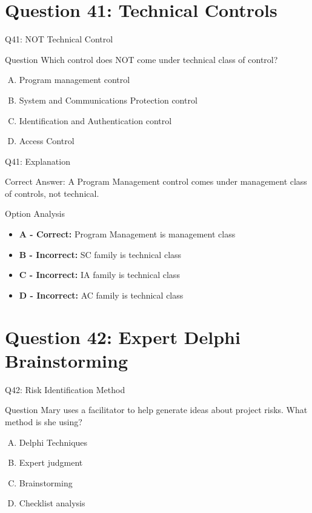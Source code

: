 \documentclass{beamer}
\begin{document}
	\section{Question 41: Technical Controls}
	
	\begin{frame}{Q41: NOT Technical Control}
		\begin{block}{Question}
			Which control does NOT come under technical class of control?
		\end{block}
		\begin{enumerate}[(A)]
			\item Program management control
			\item System and Communications Protection control
			\item Identification and Authentication control
			\item Access Control
		\end{enumerate}
	\end{frame}
	
	\begin{frame}{Q41: Explanation}
		\begin{block}{Correct Answer: A}
			Program Management control comes under management class of controls, not technical.
		\end{block}
		\begin{block}{Option Analysis}
			\begin{itemize}
				\item \textbf{A - Correct:} Program Management is management class
				\item \textbf{B - Incorrect:} SC family is technical class
				\item \textbf{C - Incorrect:} IA family is technical class
				\item \textbf{D - Incorrect:} AC family is technical class
			\end{itemize}
		\end{block}
	\end{frame}
	
	\section{Question 42: Expert Delphi Brainstorming}
	
	\begin{frame}{Q42: Risk Identification Method}
		\begin{block}{Question}
			Mary uses a facilitator to help generate ideas about project risks. What method is she using?
		\end{block}
		\begin{enumerate}[(A)]
			\item Delphi Techniques
			\item Expert judgment
			\item Brainstorming
			\item Checklist analysis
		\end{enumerate}
	\end{frame}
	
\end{document}
